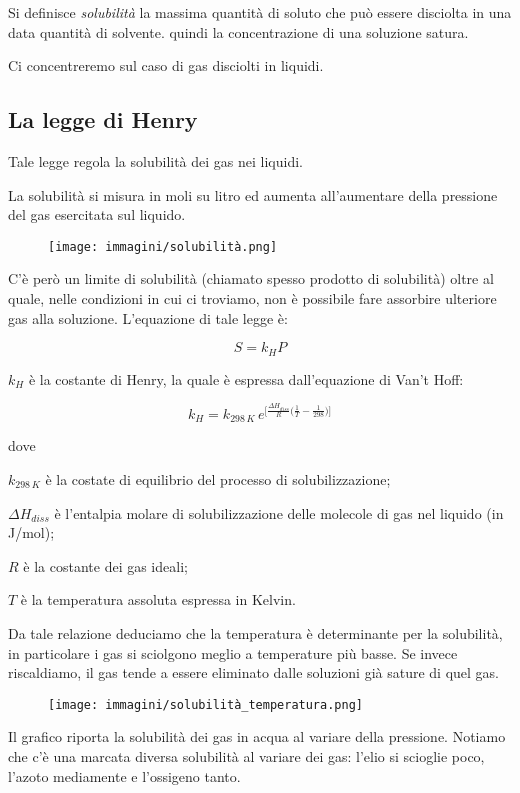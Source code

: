 Si definisce \textit{solubilità} la massima quantità di soluto che può essere disciolta in una data quantità di
solvente. \E quindi la concentrazione di una soluzione satura.

Ci concentreremo sul caso di gas disciolti in liquidi.
\subsection{La legge di Henry}
Tale legge regola la solubilità dei gas nei liquidi.

La solubilità si misura in moli su litro ed aumenta all'aumentare della pressione del gas esercitata sul liquido.
\begin{figure}[htp]
    \centering
    \texttt{[image: immagini/solubilità.png]}
\end{figure}

C'è però un limite di solubilità (chiamato spesso prodotto di solubilità) oltre al quale, nelle condizioni in cui ci troviamo, non è possibile fare assorbire ulteriore gas alla soluzione.
L'equazione di tale legge è:

$$S=k_HP$$

$k_H$ è la costante di Henry, la quale è espressa dall'equazione di Van't Hoff:

$$k_H=k_{298 \, K} \, e^{\big[\frac{\Delta H_{diss}}{R} \big( \frac{1}{T} - \frac{1}{298} \big) \big]}$$

dove

$k_{298 \, K}$ è la costate di equilibrio del processo di solubilizzazione;

$\Delta H_{diss}$ è l'entalpia molare di solubilizzazione delle molecole di gas nel liquido (in J/mol);

$R$ è la costante dei gas ideali;

$T$ è la temperatura assoluta espressa in Kelvin.

Da tale relazione deduciamo che la temperatura è determinante per la solubilità, in particolare i gas si sciolgono meglio a temperature più basse. Se invece riscaldiamo, il gas tende a essere eliminato dalle soluzioni già sature di quel gas.

\begin{minipage}{0.5 \textwidth}
    \begin{figure}[H]
        \centering
        \texttt{[image: immagini/solubilità\_temperatura.png]}
    \end{figure}
\end{minipage}
\begin{minipage}{0.4 \textwidth}
    \vspace{0.8cm}Il grafico riporta la solubilità dei gas in acqua al variare della pressione. Notiamo che c'è una marcata diversa solubilità al variare dei gas: l'elio si scioglie poco, l'azoto mediamente e l'ossigeno tanto.
\end{minipage}


